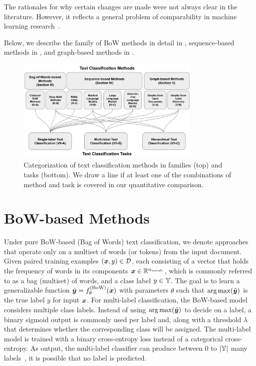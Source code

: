 \documentclass[acmsmall,nonacm]{acmart}
\begin{document}
The rationales for why certain changes are made were not always clear in the literature.
However, it reflects a general problem of comparability in machine learning research~\cite{leech2024questionablepracticesmachinelearning}.

Below, we describe the family of BoW methods in detail in , 
sequence-based methods in , and graph-based methods in . 

\begin{figure}
    \centering
    \includegraphics[width=0.8\textwidth]{TextClfSurvey-Figure1}
    \caption{Categorization of text classification methods in families (top) and tasks (bottom). 
    We draw a line if at least one of the combinations of method and task is covered in our quantitative comparison.}
    \label{fig:one}

\end{figure}

\section{BoW-based Methods}\label{sec:bow}
Under pure BoW-based (Bag of Words) text classification, we denote approaches that operate only on a multiset of words (or tokens) from the input document. 
Given paired training examples $({\bm{x}},y) \in \mathcal{D}$, each consisting of a vector that holds the frequency of words in its components ${\bm{x}} \in {\mathbb{R}}^{n_\mathrm{vocab}}$, which is commonly referred to as a bag (multiset) of words, and a class label $y \in {\mathbb{Y}}$. 
The goal is to learn a generalizable function $\hat{{\bm{y}}} = f_\theta^{(\mathrm{BoW})}({\bm{x}})$ with parameters $\theta$ such that $\operatorname{arg\,max}(\hat{{\bm{y}}})$ is the true label $y$ for input ${\bm{x}}$.
For multi-label classification, the BoW-based model considers multiple class labels. 
Instead of using $\operatorname{arg\,max}(\hat{{\bm{y}}})$ to decide on a label, a binary sigmoid output is commonly used per label and, along with a threshold $\lambda$ that determines whether the corresponding class will be assigned. 
The multi-label model is trained with a binary cross-entropy loss instead of a categorical cross-entropy.
As output, the multi-label classifier can produce between $0$ to $|{\mathbb{Y}}|$ many labels~\cite{DBLP:journals/csur/Sebastiani02}, \ie it is possible that no label is predicted.
\end{document}
